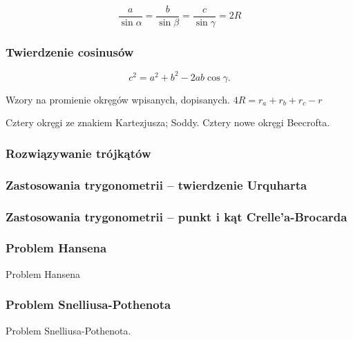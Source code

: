 $$\frac{a}{\sin \alpha} = \frac{b}{\sin \beta} = \frac{c}{\sin \gamma} = 2R$$

\subsubsection{Twierdzenie cosinusów}
\begin{proposition}
	\label{twierdzenie_cosinusow}%
	\begin{equation}
		c^2 = a^2 + b^2 - 2ab \cos \gamma.
	\end{equation}
\end{proposition}

%

Wzory na promienie okręgów wpisanych, dopisanych.
$4R = r_a + r_b + r_c - r$ %



Cztery okręgi ze znakiem Kartezjusza; Soddy.
Cztery nowe okręgi Beecrofta.

\subsubsection{Rozwiązywanie trójkątów}


\subsubsection{Zastosowania trygonometrii -- twierdzenie Urquharta}


\subsubsection{Zastosowania trygonometrii -- punkt i kąt Crelle'a-Brocarda}


\subsubsection{Problem Hansena}
Problem Hansena
%

\subsubsection{Problem Snelliusa-Pothenota}
Problem Snelliusa-Pothenota.
%

